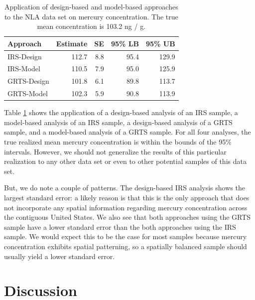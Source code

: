 \documentclass[]{elsarticle} %
\begin{document}
\begin{table}[ht]
\centering
\begin{tabular}{lrrrr}
  \hline
Approach & Estimate & SE & 95\% LB & 95\% UB \\ 
  \hline
IRS-Design & 112.7 & 8.8 & 95.4 & 129.9 \\ 
  IRS-Model & 110.5 & 7.9 & 95.0 & 125.9 \\ 
  GRTS-Design & 101.8 & 6.1 & 89.8 & 113.7 \\ 
  GRTS-Model & 102.3 & 5.9 & 90.8 & 113.9 \\ 
   \hline
\end{tabular}
\caption{\label{tab:appliedtab} Application of design-based and model-based approaches to the NLA data set on mercury concentration. The true mean concentration is 103.2 ng / g.} 
\end{table}

Table \ref{tab:appliedtab} shows the application of a design-based
analysis of an IRS sample, a model-based analysis of an IRS sample, a
design-based analysis of a GRTS sample, and a model-based analysis of a
GRTS sample. For all four analyses, the true realized mean mercury
concentration is within the bounds of the 95\% intervals. However, we
should not generalize the results of this particular realization to any
other data set or even to other potential samples of this data set.

But, we do note a couple of patterns. The design-based IRS analysis
shows the largest standard error: a likely reason is that this is the
only approach that does not incorporate any spatial information
regarding mercury concentration across the contiguous United States. We
also see that both approaches using the GRTS sample have a lower
standard error than the both approaches using the IRS sample. We would
expect this to be the case for most samples because mercury
concentration exhibits spatial patterning, so a spatially balanced
sample should usually yield a lower standard error.

\hypertarget{sec:discussion}{%
\section{Discussion}\label{sec:discussion}}
\end{document}
